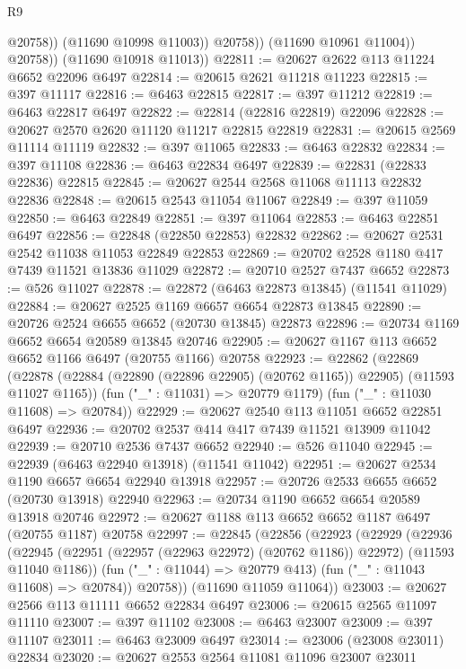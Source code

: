 \begin{lexlean}{R9}
\begin{coremodule}
                      @20758))
                  (@11690 @10998 @11003))
                @20758))
            (@11690 @10961 @11004))
          @20758))
      (@11690 @10918 @11013))
@22811 := @20627 @2622 @113 @11224 @6652 @22096 @6497
@22814 := @20615 @2621 @11218 @11223
@22815 := @397 @11117
@22816 := @6463 @22815
@22817 := @397 @11212
@22819 := @6463 @22817 @6497
@22822 := @22814 (@22816 @22819) @22096
@22828 := @20627 @2570 @2620 @11120 @11217 @22815 @22819
@22831 := @20615 @2569 @11114 @11119
@22832 := @397 @11065
@22833 := @6463 @22832
@22834 := @397 @11108
@22836 := @6463 @22834 @6497
@22839 := @22831 (@22833 @22836) @22815
@22845 := @20627 @2544 @2568 @11068 @11113 @22832 @22836
@22848 := @20615 @2543 @11054 @11067
@22849 := @397 @11059
@22850 := @6463 @22849
@22851 := @397 @11064
@22853 := @6463 @22851 @6497
@22856 := @22848 (@22850 @22853) @22832
@22862 := @20627 @2531 @2542 @11038 @11053 @22849 @22853
@22869 := @20702 @2528 @1180 @417 @7439 @11521 @13836 @11029
@22872 := @20710 @2527 @7437 @6652
@22873 := @526 @11027
@22878 := @22872 (@6463 @22873 @13845) (@11541 @11029)
@22884 := @20627 @2525 @1169 @6657 @6654 @22873 @13845
@22890 := @20726 @2524 @6655 @6652 (@20730 @13845) @22873
@22896 := @20734 @1169 @6652 @6654 @20589 @13845 @20746
@22905 := @20627 @1167 @113 @6652 @6652 @1166 @6497 (@20755 @1166) @20758
@22923 := @22862
    (@22869
      (@22878 (@22884 (@22890 (@22896 @22905) (@20762 @1165)) @22905) (@11593 @11027 @1165))
      (fun ("_" : @11031) => @20779 @1179)
      (fun ("_" : @11030 @11608) => @20784))
@22929 := @20627 @2540 @113 @11051 @6652 @22851 @6497
@22936 := @20702 @2537 @414 @417 @7439 @11521 @13909 @11042
@22939 := @20710 @2536 @7437 @6652
@22940 := @526 @11040
@22945 := @22939 (@6463 @22940 @13918) (@11541 @11042)
@22951 := @20627 @2534 @1190 @6657 @6654 @22940 @13918
@22957 := @20726 @2533 @6655 @6652 (@20730 @13918) @22940
@22963 := @20734 @1190 @6652 @6654 @20589 @13918 @20746
@22972 := @20627 @1188 @113 @6652 @6652 @1187 @6497 (@20755 @1187) @20758
@22997 := @22845
    (@22856
      (@22923
        (@22929
          (@22936
            (@22945 (@22951 (@22957 (@22963 @22972) (@20762 @1186)) @22972) (@11593 @11040 @1186))
            (fun ("_" : @11044) => @20779 @413)
            (fun ("_" : @11043 @11608) => @20784))
          @20758))
      (@11690 @11059 @11064))
@23003 := @20627 @2566 @113 @11111 @6652 @22834 @6497
@23006 := @20615 @2565 @11097 @11110
@23007 := @397 @11102
@23008 := @6463 @23007
@23009 := @397 @11107
@23011 := @6463 @23009 @6497
@23014 := @23006 (@23008 @23011) @22834
@23020 := @20627 @2553 @2564 @11081 @11096 @23007 @23011

\end{coremodule}
\end{lexlean}
